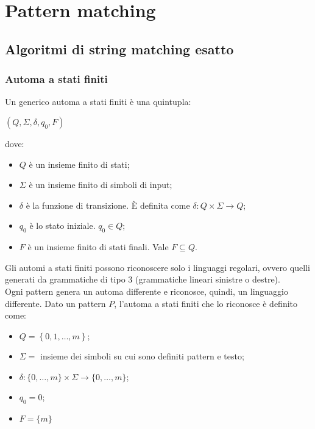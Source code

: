 \chapter{Pattern matching}
\section{Algoritmi di string matching esatto}

\subsection*{Automa a stati finiti}
Un generico automa a stati finiti è una quintupla:
\begin{center}
    $(Q, \Sigma, \delta, q_0, F)$
\end{center}
dove:
\begin{itemize}
    \item $Q$ è un insieme finito di stati;
    \item $\Sigma$ è un insieme finito di simboli di input;
    \item $\delta$ è la funzione di transizione. È definita come $\delta: Q \times \Sigma \rightarrow Q$;
    \item $q_0$ è lo stato iniziale. $q_0 \in Q$;
    \item $F$ è un insieme finito di stati finali. Vale $F \subseteq Q$.
\end{itemize}
Gli automi a stati finiti possono riconoscere solo i linguaggi regolari, ovvero quelli generati da grammatiche di tipo 3 (grammatiche lineari sinistre o destre).\\
Ogni pattern genera un automa differente e riconosce, quindi, un linguaggio differente.
Dato un pattern $P$, l'automa a stati finiti che lo riconosce è definito come:
\begin{itemize}
    \item $Q = \left\{ 0, 1, \ldots, m \right\}$;
    \item $\Sigma = $ insieme dei simboli su cui sono definiti pattern e testo; 
    \item $\delta : \{ 0, \ldots, m \} \times \Sigma \rightarrow \{ 0, \ldots, m \}$;
    \item $q_0 = 0$;
    \item $F = \{ m \}$
\end{itemize}


